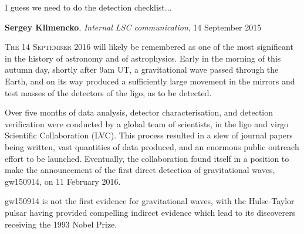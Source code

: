 
\epigraph{I guess we need to do the detection checklist...}{\textbf{Sergey Klimencko}, \emph{Internal LSC communication}, 14 September 2015}

\lettrine[lines=3]{T}{he 14 September 2016} will likely be remembered as one of the most
significant in the history of astronomy and of astrophysics. Early in
the morning of this autumn day, shortly after 9am UT, a gravitational
wave passed through the Earth, and on its way produced a sufficiently
large movement in the mirrors and test masses of the detectors of the
\gls{ligo}, as to be
detected.

Over five months of data analysis, detector characterisation, and
detection verification were conducted by a global team of scientists,
in the \gls{ligo} and \gls{virgo} Scientific Collaboration (LVC). This process
resulted in a slew of journal papers being written, vast quantities of
data produced, and an enormous public outreach effort to be
launched. Eventually, the collaboration found itself in a position to
make the announcement of the first direct detection of gravitational
waves, \gls{gw150914}, on 11 February 2016.

\gls{gw150914} is not the first evidence for gravitational waves, with the
Hulse-Taylor pulsar\cite{1975ApJ...195L..51H,2005ASPC..328...25W}
having provided compelling indirect evidence which lead to its
discoverers receiving the 1993 Nobel Prize.
